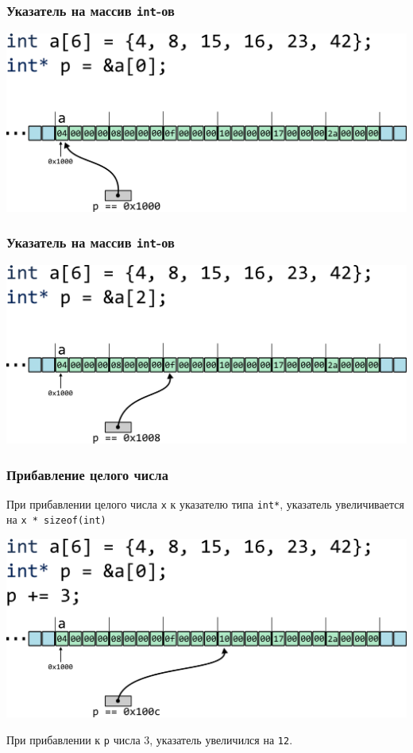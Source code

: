 \documentclass[10pt,pdf,hyperref={unicode}]{beamer}
\begin{document}
\begin{frame}[fragile]
\frametitle{Указатель на массив \texttt{int}-ов} 
\begin{center}
\includegraphics[width=0.86\linewidth]{../images/pointer_arithmetics/parithmetics_0_initial_int.png}
\end{center}
\end{frame}

\begin{frame}[fragile]
\frametitle{Указатель на массив \texttt{int}-ов} 
\begin{center}
\includegraphics[width=0.86\linewidth]{../images/pointer_arithmetics/parithmetics_1_initial_int.png}
\end{center}
\end{frame}

\begin{frame}[fragile]
\frametitle{Прибавление целого числа} 
При прибавлении целого числа \texttt{x} к указателю типа \texttt{int*}, 
указатель увеличивается на \texttt{x * sizeof(int)}
\begin{center}
\includegraphics[width=0.86\linewidth]{../images/pointer_arithmetics/parithmetics_2_addition.png}
\end{center}
При прибавлении к \texttt{p} числа 3, указатель увеличился на \texttt{12}.
\end{frame}
\end{document}
